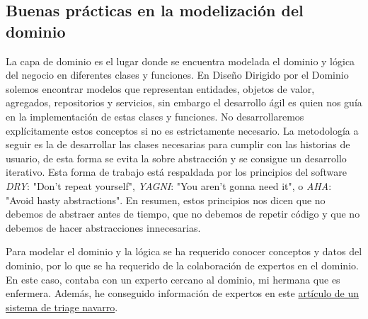 \subsection{Buenas prácticas en la modelización del dominio}
La capa de dominio es el lugar donde se encuentra modelada el dominio y lógica del negocio en diferentes clases y funciones.
En Diseño Dirigido por el Dominio solemos encontrar modelos que representan entidades, objetos de valor, agregados, repositorios y servicios, sin embargo
el desarrollo ágil es quien nos guía en la implementación de estas clases y funciones. No desarrollaremos explícitamente estos conceptos si no es estrictamente necesario.
La metodología a seguir es la de desarrollar las clases necesarias para cumplir con las historias de usuario, de esta forma se evita la sobre abstracción y se consigue un desarrollo iterativo.
Esta forma de trabajo está respaldada por los principios del software \textit{DRY}: "Don't repeat yourself", \textit{YAGNI}: "You aren't gonna need it", o \textit{AHA}: "Avoid hasty abstractions".
En resumen, estos principios nos dicen que no debemos de abstraer antes de tiempo, que no debemos de repetir código y que no debemos de hacer abstracciones innecesarias.

Para modelar el dominio y la lógica se ha requerido conocer conceptos y datos del dominio, por lo que se ha requerido de la colaboración de expertos en el dominio.
En este caso, contaba con un experto cercano al dominio, mi hermana que es enfermera. Además, he conseguido información de expertos en este \href{https://scielo.isciii.es/scielo.php?script=sci_arttext&pid=S1137-66272010000200008}{artículo de un sistema de triage navarro}.

